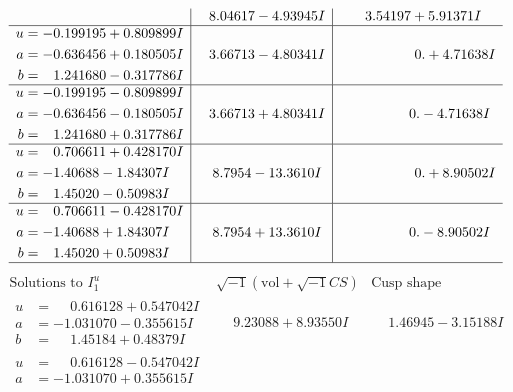 \documentclass[1p]{elsarticle_modified}
\theoremstyle{definition}
\newcommand{\I}{\sqrt{-1}}
\begin{document}
$$\begin{array}{c|c|c}
 & \phantom{-}8.04617 - 4.93945 I & \phantom{-}3.54197 + 5.91371 I \\ \hline\begin{aligned}
u &= -0.199195 + 0.809899 I \\
a &= -0.636456 + 0.180505 I \\
b &= \phantom{-}1.241680 - 0.317786 I\end{aligned}
 & \phantom{-}3.66713 - 4.80341 I & \phantom{-0.000000 -}0. + 4.71638 I \\ \hline\begin{aligned}
u &= -0.199195 - 0.809899 I \\
a &= -0.636456 - 0.180505 I \\
b &= \phantom{-}1.241680 + 0.317786 I\end{aligned}
 & \phantom{-}3.66713 + 4.80341 I & \phantom{-0.000000 } 0. - 4.71638 I \\ \hline\begin{aligned}
u &= \phantom{-}0.706611 + 0.428170 I \\
a &= -1.40688 - 1.84307 I \\
b &= \phantom{-}1.45020 - 0.50983 I\end{aligned}
 & \phantom{-}8.7954 - 13.3610 I & \phantom{-0.000000 -}0. + 8.90502 I \\ \hline\begin{aligned}
u &= \phantom{-}0.706611 - 0.428170 I \\
a &= -1.40688 + 1.84307 I \\
b &= \phantom{-}1.45020 + 0.50983 I\end{aligned}
 & \phantom{-}8.7954 + 13.3610 I & \phantom{-0.000000 } 0. - 8.90502 I\\
 \hline 
 \end{array}$$\newpage$$\begin{array}{c|c|c}  
\text{Solutions to }I^u_{1}& \I (\text{vol} + \sqrt{-1}CS) & \text{Cusp shape}\\
 \hline 
\begin{aligned}
u &= \phantom{-}0.616128 + 0.547042 I \\
a &= -1.031070 - 0.355615 I \\
b &= \phantom{-}1.45184 + 0.48379 I\end{aligned}
 & \phantom{-}9.23088 + 8.93550 I & \phantom{-}1.46945 - 3.15188 I \\ \hline\begin{aligned}
u &= \phantom{-}0.616128 - 0.547042 I \\
a &= -1.031070 + 0.355615 I \\

\end{aligned}
\end{array}$$
\end{document}
